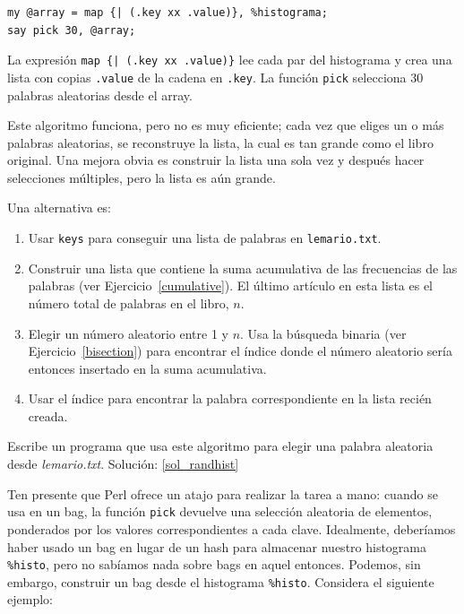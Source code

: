 \begin{verbatim}
my @array = map {| (.key xx .value)}, %histograma;
say pick 30, @array;
\end{verbatim}
%
La expresión \verb'map {| (.key xx .value)}' lee cada par del
histograma y crea una lista con copias {\tt .value} de la cadena
en {\tt .key}. La función {\tt pick} selecciona 30 palabras aleatorias
desde el array.

Este algoritmo funciona, pero no es muy eficiente; cada vez que eliges
un o más palabras aleatorias, se reconstruye la lista, la cual es tan
grande como el libro original. Una mejora obvia es construir la lista una
sola vez y después hacer selecciones múltiples, pero la lista es aún
grande.

Una alternativa es:

\begin{enumerate}

\item Usar {\tt keys} para conseguir una lista de palabras
en {\tt lemario.txt}.

\item Construir una lista que contiene la suma acumulativa de
las frecuencias de las palabras (ver Ejercicio~\ref{cumulative}).
El último artículo en esta lista es el número total de palabras
en el libro, $n$.
  
\item Elegir un número aleatorio entre 1 y $n$.  Usa la búsqueda binaria
(ver Ejercicio~\ref{bisection}) para encontrar el índice donde el
número aleatorio sería entonces insertado en la suma acumulativa.

\item Usar el índice para encontrar la palabra correspondiente en la
lista recién creada.

\end{enumerate}

\begin{exercise}
\label{randhist}

Escribe un programa que usa este algoritmo para elegir una palabra
aleatoria desde \emph{lemario.txt}.
Solución: \ref{sol_randhist}
\end{exercise}

Ten presente que Perl ofrece un atajo para realizar la tarea a mano:
cuando se usa en un bag, la función {\tt pick} devuelve una selección
aleatoria de elementos, ponderados por los valores correspondientes
a cada clave. Idealmente, deberíamos haber usado un bag en lugar de un
hash para almacenar nuestro histograma \verb|%histo|, pero no sabíamos
nada sobre bags en aquel entonces. Podemos, sin embargo, construir un
bag desde el histograma \verb|%histo|. Considera el siguiente ejemplo:

